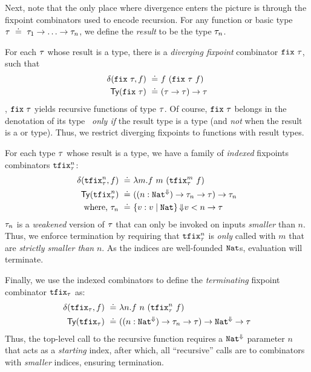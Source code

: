 Next, note that the only place where divergence enters the picture is 
through the fixpoint combinators used to encode recursion. 
%
For any function or basic type $\tau \ \doteq\  \tau_1 \rightarrow \ldots \rightarrow \tau_n$,
we define the \emph{result} to be the type $\tau_n$.

For each $\tau$ whose result is a \Div type, 
there is a \emph{diverging fixpoint} combinator
$\mathtt{fix}\ {\tau}$, such that
%
\begin{align*}
  \delta(\mathtt{fix}\ {\tau}, f) \ \doteq\  & f\ (\mathtt{fix}\ {\tau}\ f) \\
  \mathsf{Ty}({\mathtt{fix}\ {\tau}})   \ \doteq\  & (\tau \rightarrow \tau) \rightarrow \tau
\end{align*}
%
\ie, $\mathtt{fix}\ {\tau}$ yields recursive functions of type $\tau$.
Of course, $\mathtt{fix}\ {\tau}$ belongs in the denotation of
its type~\cite{PLC} \emph{only if} the result type is 
a \Div type (and \emph{not} when the result is a 
\Wnf or \Fin type). 
%
Thus, we restrict diverging fixpoints to functions with \Div result types.

For each type $\tau$ whose result is a \Fin 
type, we have a family of \emph{indexed} 
fixpoints combinators $\mathtt{tfix}^{n}_{\tau}$: 
%
\begin{align*}
  \delta(\mathtt{tfix}^{n}_{\tau}, f) \ \doteq\  & {\lambda m. f\ m\ (\mathtt{tfix}^{m}_{\tau}\ f)}\\
\mathsf{Ty}({\mathtt{tfix}^{n}_{\tau}}) \ \doteq\  & 
  {({(n:{\mathtt{Nat}}^{\Downarrow})} \rightarrow {\ensuremath{{\tau}_{n}}} \rightarrow {\ensuremath{\tau}})} \rightarrow {\ensuremath{{\tau}_{n}}} \\
\mbox{where,}\ {\tau}_{n} \ \doteq\  & {\left\lbrace v : v\mid \mathtt{Nat}\right\rbrace{\ensuremath{\Downarrow}}{v < n}} \rightarrow {\ensuremath{\tau}}
\end{align*}
%
${\tau}_{n}$ is a \emph{weakened} version of $\tau$ 
that can only be invoked on inputs \emph{smaller} than $n$.
%
Thus, we enforce termination by requiring that $\mathtt{tfix}^{n}_{\tau}$ is 
\emph{only} called with $m$ that are \emph{strictly smaller than} $n$. 
% 
As the indices are well-founded $\mathtt{Nat}$s, evaluation will terminate. 
  
Finally, we use the indexed combinators to define the 
\emph{terminating} fixpoint combinator $\mathtt{tfix}_{\tau}$ as:
\begin{align*}
  \delta(\mathtt{tfix}_{\tau}, f) \ \doteq\  & {\lambda n. f\ n\ (\mathtt{tfix}^{n}_{\tau}\ f)}\\
\mathsf{Ty}({\mathtt{tfix}_{\tau}}) \ \doteq\  & 
  {({(n:{\mathtt{Nat}}^{\Downarrow})} \rightarrow {\ensuremath{{\tau}_{n}}} \rightarrow {\ensuremath{\tau}})} \rightarrow {\ensuremath{{{\mathtt{Nat}}^{\Downarrow}} \rightarrow {\ensuremath{\tau}}}}
\end{align*}
%
Thus, the top-level call to the recursive function
requires a ${\mathtt{Nat}}^{\Downarrow}$ parameter $n$ that acts
as a \emph{starting} index, after which, all ``recursive''
calls are to combinators with \emph{smaller} indices, 
ensuring termination.

